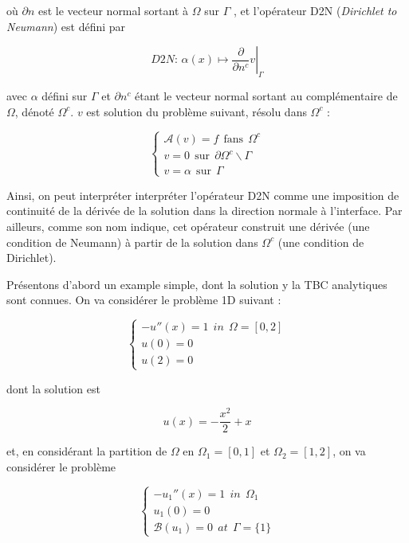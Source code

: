 \noindent où $\partial n$ est le vecteur normal sortant à $\Omega$ sur $\Gamma$ , et l'opérateur D2N (\emph{Dirichlet to Neumann}) est défini par

$$\left. D2N \text{: } \alpha(x) \mapsto \frac{\partial}{\partial n^c}v \right\rvert_{\Gamma}$$

\noindent avec $\alpha$ défini sur $\Gamma$ et $\partial n^c$ étant le vecteur normal sortant au complémentaire de $\Omega$, dénoté $\Omega^c$. $v$ est solution du problème suivant, résolu dans $\Omega^c$ : 

\begin{equation*}
\begin{cases}
\mathcal{A}(v) = f \ \ \text{fans} \ \ \Omega^c\\
v = 0 \ \ \text{sur} \ \ \partial \Omega^c \backslash \Gamma \\
v = \alpha \ \ \text{sur} \ \ \Gamma
\end{cases}
\end{equation*}

\indent Ainsi, on peut interpréter interpréter l'opérateur D2N comme une imposition de continuité de la dérivée de la solution dans la direction normale à l'interface. Par ailleurs, comme son nom indique, cet opérateur construit une dérivée (une condition de Neumann) à partir de la solution dans $\Omega^c$ (une condition de Dirichlet).

\indent Présentons d'abord un example simple, dont la solution y la TBC analytiques sont connues. On va considérer le problème 1D suivant :

\begin{equation*}
\begin{cases}
-u''(x) = 1 \ \ in \ \ \Omega = [0,2]\\
u(0) = 0 \\
u(2) = 0
\end{cases}
\end{equation*}

\noindent dont la solution est

$$u(x) = -\frac{x^2}{2} + x$$

\noindent et, en considérant la partition de $\Omega$ en $\Omega_1 = [0,1]$ et $\Omega_2 = [1,2]$, on va considérer le problème

\begin{equation*}
\begin{cases}
-u_1''(x) = 1 \ \ in \ \ \Omega_1\\
u_1(0) = 0 \\
\mathcal{B}(u_1) = 0 \ \ at \ \ \Gamma=\{1\}
\end{cases}
\end{equation*}

